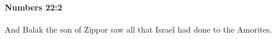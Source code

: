 
		\paragraph{Numbers 22:2} %
			\label{NUMBERS-22-2}

			And Balak the son of Zippor saw all that Israel had done to the Amorites.


